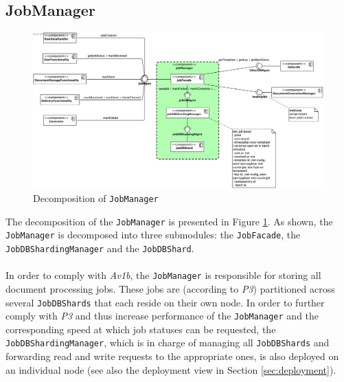 \documentclass[a4paper,10pt]{article}
\begin{document}
\subsection{JobManager}\label{subsec:decomp-JobManager}
\begin{figure}[!htp]
	\centering
	\includegraphics[height=0.8\textheight]{JobManager.png}
	\caption{Decomposition of \texttt{JobManager}}
	\label{fig:decomp-JobManager}
\end{figure}
\FloatBarrier
\noindent
The decomposition of the \texttt{JobManager} is presented in Figure \ref{fig:decomp-JobManager}. As shown, the \texttt{JobManager} is decomposed into three submodules: the \texttt{JobFacade}, the \texttt{JobDBShardingManager} and the \texttt{JobDBShard}.\\\\
In order to comply with \textit{Av1b}, the \texttt{JobManager} is responsible for storing all document processing jobs. These jobs are (according to \textit{P3}) partitioned across several \texttt{JobDBShards} that each reside on their own node. In order to further comply with \textit{P3} and thus increase performance of the \texttt{JobManager} and the corresponding speed at which job statuses can be requested, the \texttt{JobDBShardingManager}, which is in charge of managing all \texttt{JobDBShards} and forwarding read and write requests to the appropriate ones, is also deployed on an individual node (see also the deployment view in Section \ref{sec:deployment}).\\\\
\end{document}
